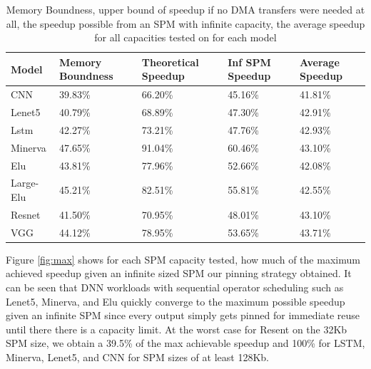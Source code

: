 \begin{table}[]
	\begin{tabular}{|l|l|l|l|l|}
		\hline
		Model     & Memory Boundness & Theoretical Speedup & Inf SPM Speedup & Average Speedup\\ \hline
		CNN       & 39.83\%          & 66.20\%             & 45.16\%              & 41.81\%        \\ \hline
		Lenet5    & 40.79\%          & 68.89\%             & 47.30\%              & 42.91\%        \\ \hline
		Lstm      & 42.27\%          & 73.21\%             & 47.76\%              & 42.93\%        \\ \hline
		Minerva   & 47.65\%          & 91.04\%             & 60.46\%              & 43.10\%        \\ \hline
		Elu       & 43.81\%          & 77.96\%             & 52.66\%              & 42.08\%        \\ \hline
		Large-Elu & 45.21\%          & 82.51\%             & 55.81\%              & 42.55\%        \\ \hline
		Resnet    & 41.50\%          & 70.95\%             & 48.01\%              & 43.10\%        \\ \hline
		VGG       & 44.12\%          & 78.95\%             & 53.65\%              & 43.71\%        \\ \hline
	\end{tabular}
	\caption[Comparison of Speedup Acheived and Upper Bound Speedup]{Memory Boundness, upper bound of speedup if no DMA transfers were needed at all, the speedup possible from an SPM with infinite capacity, the average
	speedup for all capacities tested on for each model}
	\label{tab:memory_bound}
\end{table}

Figure \ref{fig:max} shows for each SPM capacity tested, how much of the
maximum achieved speedup given an infinite sized SPM our pinning strategy
obtained. It can be seen that DNN workloads with sequential operator scheduling
such as Lenet5, Minerva, and Elu quickly converge to the maximum possible
speedup given an infinite SPM since every output simply gets pinned for
immediate reuse until there there is a capacity limit. At the worst case for Resent
on the 32Kb SPM size, we obtain a 39.5\% of the max achievable speedup and 100\% for
LSTM, Minerva, Lenet5, and CNN for SPM sizes of at least 128Kb.

